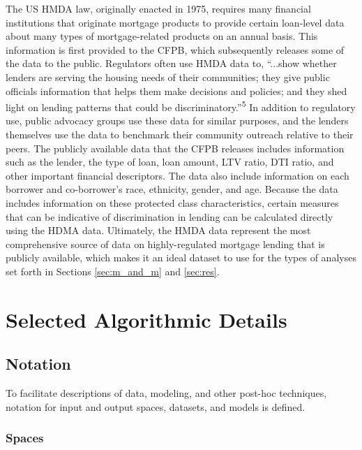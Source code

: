 \documentclass[information,article,submit,moreauthors,pdftex]{definitions/mdpi}
\begin{document}
The US HMDA law, originally enacted in 1975, requires many financial institutions that originate mortgage products to provide certain loan-level data about many types of mortgage-related products on an annual basis. This information is first provided to the CFPB, which subsequently releases some of the data to the public. Regulators often use HMDA data to, ``...show whether lenders are serving the housing needs of their communities; they give public officials information that helps them make decisions and policies; and they shed light on lending patterns that could be discriminatory.''\textsuperscript{5} In addition to regulatory use, public advocacy groups use these data for similar purposes, and the lenders themselves use the data to benchmark their community outreach relative to their peers.  The publicly available data that the CFPB releases includes information such as the lender, the type of loan, loan amount, LTV ratio, DTI ratio, and other important financial descriptors. The data also include information on each borrower and co-borrower’s race, ethnicity, gender, and age. Because the data includes information on these protected class characteristics, certain measures that can be indicative of discrimination in lending can be calculated directly using the HDMA data. Ultimately, the HMDA data represent the most comprehensive source of data on highly-regulated mortgage lending that is publicly available, which makes it an ideal dataset to use for the types of analyses set forth in Sections \ref{sec:m_and_m} and \ref{sec:res}.  

\section{Selected Algorithmic Details}\label{a_sec:algo}

\subsection{Notation}\label{a_ssec:not}

To facilitate descriptions of data, modeling, and other post-hoc techniques, notation for input and output spaces, datasets, and models is defined.

\subsubsection{Spaces} 
\end{document}
